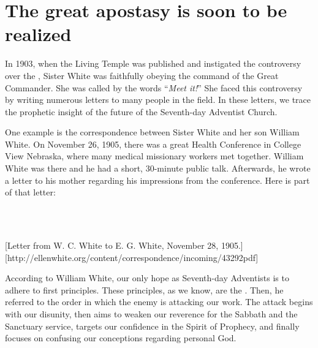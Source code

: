 \chapter{The great apostasy is soon to be realized} \label{chap:apostasy}

In 1903, when the Living Temple was published and instigated the controversy over the , Sister White was faithfully obeying the command of the Great Commander. She was called by the words “\textit{Meet it!}” She faced this controversy by writing numerous letters to many people in the field. In these letters, we trace the prophetic insight of the future of the Seventh-day Adventist Church.

One example is the correspondence between Sister White and her son William White. On November 26, 1905, there was a great Health Conference in College View Nebraska, where many medical missionary workers met together. William White was there and he had a short, 30-minute public talk. Afterwards, he wrote a letter to his mother regarding his impressions from the conference. Here is part of that letter: 

 \\
 \\

[Letter from W. C. White to E. G. White, November 28, 1905.][http://ellenwhite.org/content/correspondence/incoming/43292pdf]

According to William White, our only hope as Seventh-day Adventists is to adhere to first principles. These principles, as we know, are the . Then, he referred to the order in which the enemy is attacking our work. The attack begins with our disunity, then aims to weaken our reverence for the Sabbath and the Sanctuary service, targets our confidence in the Spirit of Prophecy, and finally focuses on confusing our conceptions regarding personal God.

